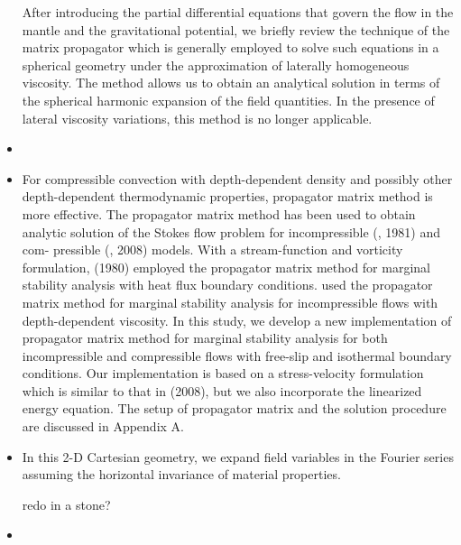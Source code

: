 \begin{itemize}
\begin{displayquote}
{\color{darkgray}
After introducing the partial differential equations that govern the flow in the
mantle and the gravitational potential, we briefly review the technique of the
matrix propagator which is generally employed to solve such equations in a
spherical geometry under the approximation of laterally homogeneous viscosity.
The method allows us to obtain an analytical solution in terms of the spherical
harmonic expansion of the field quantities. In the presence of lateral viscosity
variations, this method is no longer applicable.
}
\end{displayquote}


\item {}

\item {}

\begin{displayquote}
{\color{darkgray}
For compressible convection with depth-dependent density and
possibly other depth-dependent thermodynamic properties, propagator 
matrix method is more effective. The propagator matrix
method has been used to obtain analytic solution of the Stokes flow
problem for incompressible (\textcite{haoc81}, 1981) and com-
pressible (\textcite{lezh08}, 2008) models. With a stream-function
and vorticity formulation, \textcite{jamc80} (1980) employed the
propagator matrix method for marginal stability analysis with heat
flux boundary conditions. \textcite{bugo94} used the propagator
matrix method for marginal stability analysis for incompressible
flows with depth-dependent viscosity. In this study, we develop a
new implementation of propagator matrix method for marginal stability 
analysis for both incompressible and compressible flows with
free-slip and isothermal boundary conditions. Our implementation
is based on a stress-velocity formulation which is similar to that
in \textcite{lezh08} (2008), but we also incorporate the linearized
energy equation. The setup of propagator matrix and the solution
procedure are discussed in Appendix A.
}
\end{displayquote}



\item {}

\begin{displayquote}
{\color{darkgray}
In this 2-D Cartesian geometry, we expand field variables in the Fourier series assuming the horizontal invariance of material properties.
}
\end{displayquote}

{\color{red} redo in a stone?}



\item {}

\end{itemize}

